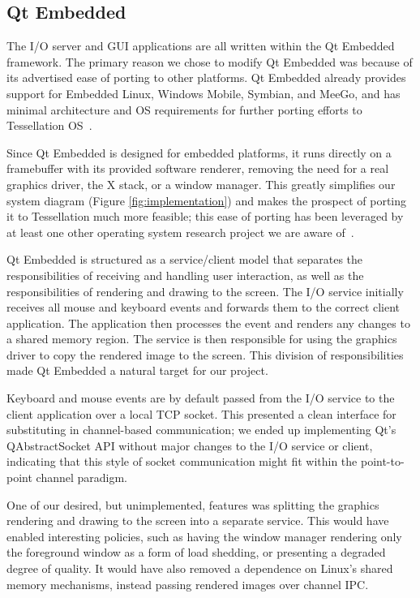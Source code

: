 \documentclass[letterpaper,twocolumn,11pt]{article}
\begin{document}
\subsection{Qt Embedded}

The I/O server and GUI applications are all written within the Qt Embedded framework. The primary reason we chose to modify Qt Embedded was because of its advertised ease of porting to other platforms. Qt Embedded already provides support for Embedded Linux, Windows Mobile, Symbian, and MeeGo, and has minimal architecture and OS requirements for further porting efforts to Tessellation OS~\cite{qtembedded}.

Since Qt Embedded is designed for embedded platforms, it runs directly on a framebuffer with its provided software renderer, removing the need for a real graphics driver, the X stack, or a window manager. This greatly simplifies our system diagram (Figure \ref{fig:implementation}) and makes the prospect of porting it to Tessellation much more feasible; this ease of porting has been leveraged by at least one other operating system research project we are aware of~\cite{ibos}. 

Qt Embedded is structured as a service/client model that separates the responsibilities of receiving and handling user interaction, as well as the responsibilities of rendering and drawing to the screen. The I/O service initially receives all mouse and keyboard events and forwards them to the correct client application. The application then processes the event and renders any changes to a shared memory region. The service is then responsible for using the graphics driver to copy the rendered image to the screen. This division of responsibilities made Qt Embedded a natural target for our project.

Keyboard and mouse events are by default passed from the I/O service to the client application over a local TCP socket. This presented a clean interface for substituting in channel-based communication; we ended up implementing Qt's QAbstractSocket API without major changes to the I/O service or client, indicating that this style of socket communication might fit within the point-to-point channel paradigm.

One of our desired, but unimplemented, features was splitting the graphics rendering and drawing to the screen into a separate service. This would have enabled interesting policies, such as having the window manager rendering only the foreground window as a form of load shedding, or presenting a degraded degree of quality. It would have also removed a dependence on Linux's shared memory mechanisms, instead passing rendered images over channel IPC.
\end{document}
